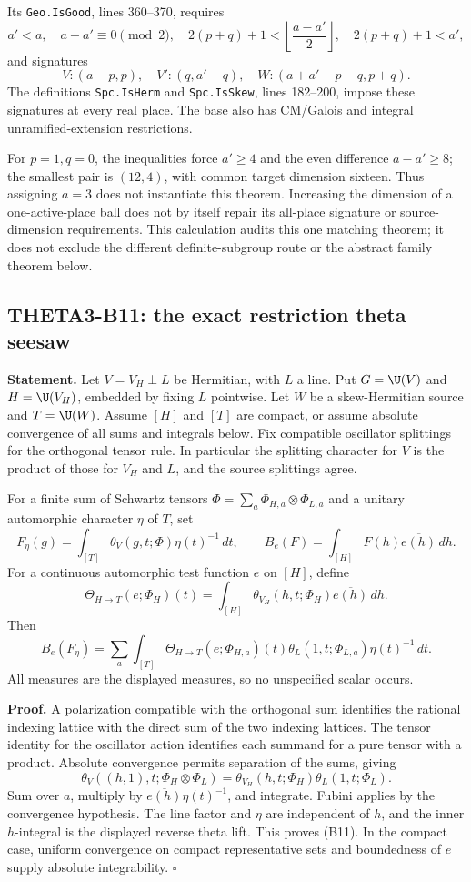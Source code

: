\documentclass[11pt]{article}
\theoremstyle{definition}\newtheorem{definition}[theorem]{Definition}\newtheorem{remark}[theorem]{Remark}
\begin{document}
Its \texttt{Geo.IsGood}, lines 360--370, requires
\[
 a'<a,\quad a+a'\equiv0\pmod2,\quad
 2(p+q)+1<\left\lfloor\frac{a-a'}2\right\rfloor,\quad
 2(p+q)+1<a',
\]
and signatures
\[
 V:(a-p,p),\quad V':(q,a'-q),\quad
 W:(a+a'-p-q,p+q).
\]
The definitions \texttt{Spc.IsHerm} and \texttt{Spc.IsSkew}, lines 182--200, impose these signatures at every real place. The base also has CM/Galois and integral unramified-extension restrictions.

For $p=1,q=0$, the inequalities force $a'\geq4$ and the even difference $a-a'\geq8$; the smallest pair is $(12,4)$, with common target dimension sixteen. Thus assigning $a=3$ does not instantiate this theorem. Increasing the dimension of a one-active-place ball does not by itself repair its all-place signature or source-dimension requirements. This calculation audits this one matching theorem; it does not exclude the different definite-subgroup route or the abstract family theorem below.

\subsection{THETA3-B11: the exact restriction theta seesaw}\label{B11}

\textbf{Statement.} Let $V=V_H\perp L$ be Hermitian, with $L$ a line. Put $G=\U(V)$ and $H=\U(V_H)$, embedded by fixing $L$ pointwise. Let $W$ be a skew-Hermitian source and $T=\U(W)$. Assume $[H]$ and $[T]$ are compact, or assume absolute convergence of all sums and integrals below. Fix compatible oscillator splittings for the orthogonal tensor rule. In particular the splitting character for $V$ is the product of those for $V_H$ and $L$, and the source splittings agree.

For a finite sum of Schwartz tensors
$\Phi=\sum_a\Phi_{H,a}\otimes\Phi_{L,a}$ and a unitary automorphic character $\eta$ of $T$, set
\[
 F_\eta(g)=\int_{[T]}\theta_V(g,t;\Phi)\eta(t)^{-1}\,dt,
 \qquad
 B_e(F)=\int_{[H]}F(h)\overline{e(h)}\,dh.
\]
For a continuous automorphic test function $e$ on $[H]$, define
\[
 \Theta_{H\to T}(e;\Phi_H)(t)=
 \int_{[H]}\theta_{V_H}(h,t;\Phi_H)\overline{e(h)}\,dh.
\]
Then
\[
 B_e(F_\eta)=\sum_a\int_{[T]}
 \Theta_{H\to T}(e;\Phi_{H,a})(t)
 \theta_L(1,t;\Phi_{L,a})\eta(t)^{-1}\,dt.
 \tag{B11}
\]
All measures are the displayed measures, so no unspecified scalar occurs.

\textbf{Proof.} A polarization compatible with the orthogonal sum identifies the rational indexing lattice with the direct sum of the two indexing lattices. The tensor identity for the oscillator action identifies each summand for a pure tensor with a product. Absolute convergence permits separation of the sums, giving
\[
 \theta_V((h,1),t;\Phi_H\otimes\Phi_L)
       =\theta_{V_H}(h,t;\Phi_H)\theta_L(1,t;\Phi_L).
\]
Sum over $a$, multiply by $\overline{e(h)}\eta(t)^{-1}$, and integrate. Fubini applies by the convergence hypothesis. The line factor and $\eta$ are independent of $h$, and the inner $h$-integral is the displayed reverse theta lift. This proves (B11). In the compact case, uniform convergence on compact representative sets and boundedness of $e$ supply absolute integrability. \hfill$\square$
\end{document}

